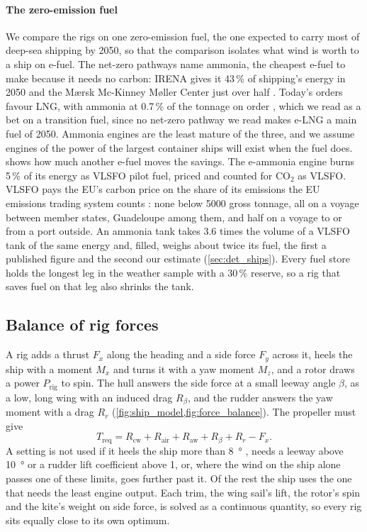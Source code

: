 \paragraph{The zero-emission fuel}
\label{sec:fuel_choice}
We compare the rigs on one zero-emission fuel, the one expected to carry most of deep-sea shipping by 2050, so that the comparison isolates what wind is worth to a ship on e-fuel. The net-zero pathways name ammonia, the cheapest e-fuel to make because it needs no carbon: IRENA gives it 43\,\% of shipping's energy in 2050 \citep{irena2021ship} and the Mærsk Mc-Kinney Møller Center just over half \citep{mmmczcs2021its,mmmczcs2021fuel}. Today's orders favour LNG, with ammonia at 0.7\,\% of the tonnage on order \citep{dnv2025mf}, which we read as a bet on a transition fuel, since no net-zero pathway we read makes e-LNG a main fuel of 2050. Ammonia engines are the least mature of the three, and we assume engines of the power of the largest container ships will exist when the fuel does.  shows how much another e-fuel moves the savings. The e-ammonia engine burns 5\,\% of its energy as VLSFO pilot fuel, priced and counted for CO$_2$ as VLSFO. VLSFO pays the EU's carbon price on the share of its emissions the EU emissions trading system counts \citep[Arts.~3ga and 3gb]{eu2023ets}: none below \num{5000} gross tonnage, all on a voyage between member states, Guadeloupe among them, and half on a voyage to or from a port outside. An ammonia tank takes 3.6 times the volume of a VLSFO tank of the same energy and, filled, weighs about twice its fuel, the first a published figure and the second our estimate (\cref{sec:det_ships}). Every fuel store holds the longest leg in the weather sample with a 30\,\% reserve, so a rig that saves fuel on that leg also shrinks the tank.

\subsection{Balance of rig forces}
\label{sec:balance}

A rig adds a thrust $F_x$ along the heading and a side force $F_y$ across it, heels the ship with a moment $M_x$ and turns it with a yaw moment $M_z$, and a rotor draws a power $P_\mathrm{rig}$ to spin. The hull answers the side force at a small leeway angle $\beta$, as a low, long wing with an induced drag $R_\beta$, and the rudder answers the yaw moment with a drag $R_r$ (\cref{fig:ship_model,fig:force_balance}). The propeller must give
\begin{equation}
T_\mathrm{req} = R_\mathrm{cw} + R_\mathrm{air} + R_\mathrm{aw} + R_\beta + R_r - F_x.
\label{eq:thrust}
\end{equation}
A setting is not used if it heels the ship more than \SI{8}{\degree} \citep{tillig2020}, needs a leeway above \SI{10}{\degree} or a rudder lift coefficient above 1, or, where the wind on the ship alone passes one of these limits, goes further past it. Of the rest the ship uses the one that needs the least engine output. Each trim, the wing sail's lift, the rotor's spin and the kite's weight on side force, is solved as a continuous quantity, so every rig sits equally close to its own optimum.


